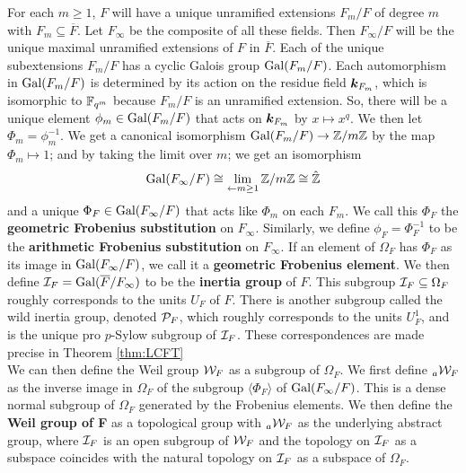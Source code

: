 For each $m \geq 1$, $F$ will have a unique unramified extensions $F_m/F$ of degree $m$ with $F_m \subseteq \overline{F}$.
Let $F_\infty$ be the composite of all these fields.
Then $F_\infty/F$ will be the unique maximal unramified extensions of $F$ in $\overline{F}$.
Each of the unique subextensions $F_m/F$ has a cyclic Galois group $\textrm{Gal}(F_m/F)$.
Each automorphism in $\textrm{Gal}(F_m/F)$ is determined by its action on the residue field $\bm{k}_{F_m}$, which is isomorphic to $\mathbb{F}_{q^m}$ because $F_m/F$ is an unramified extension.
So, there will be a unique element $\phi_m \in \textrm{Gal}(F_m/F)$ that acts on $\bm{k}_{F_m}$ by $x \mapsto x^q$.
We then let $\Phi_m = \phi_m^{-1}$.
We get a canonical isomorphism $\textrm{Gal}(F_m/F) \to \mathbb{Z}/m\mathbb{Z}$ by the map $\Phi_m \mapsto 1$; and by taking the limit over $m$; we get an isomorphism
\[\textrm{Gal}(F_\infty/F) \cong \lim_{\leftarrow m \geq 1} \mathbb{Z}/m\mathbb{Z} \cong \hat{\mathbb{Z}}\]
and a unique $\Phi_F \in \textrm{Gal}(F_\infty/F)$ that acts like $\Phi_m$ on each $F_m$.
We call this $\Phi_F$ the \textbf{geometric Frobenius substitution} on $F_\infty$.
Similarly, we define $\phi_F = \Phi_F^{-1}$ to be the \textbf{arithmetic Frobenius substitution} on $F_\infty$.
If an element of $\Omega_F$ has $\Phi_F$ as its image in $\textrm{Gal}(F_\infty/F)$, we call it a \textbf{geometric Frobenius element}.
We then define $\mathcal{I}_F = \textrm{Gal}(\overline{F}/F_\infty)$ to be the \textbf{inertia group} of $F$.
This subgroup $\mathcal{I}_F \subseteq \Omega_F$ roughly corresponds to the units $U_F$ of $F$.
There is another subgroup called the wild inertia group, denoted $\mathcal{P}_F$, which roughly corresponds to the units $U_F^1$, and is the unique pro $p$-Sylow subgroup of $\mathcal{I}_F$.
These correspondences are made precise in Theorem \ref{thm:LCFT}
\\

We can then define the Weil group $\mathcal{W}_F$ as a subgroup of $\Omega_F$.
We first define $_a\mathcal{W}_F$ as the inverse image in $\Omega_F$ of the subgroup $\langle \Phi_F\rangle$ of $\textrm{Gal}(F_\infty/F)$.
This is a dense normal subgroup of $\Omega_F$ generated by the Frobenius elements.
We then define the \textbf{Weil group of F} as a topological group with $_a\mathcal{W}_F$ as the underlying abstract group, where $\mathcal{I}_F$ is an open subgroup of $\mathcal{W}_F$ and the topology on $\mathcal{I}_F$ as a subspace coincides with the natural topology on $\mathcal{I}_F$ as a subspace of $\Omega_F$.
\\


